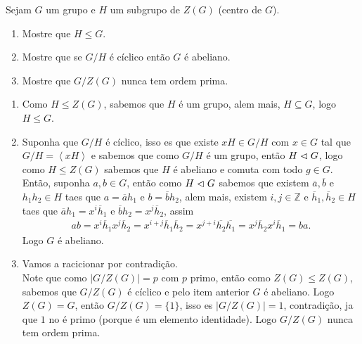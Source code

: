 \begin{homeworkProblem}
  Sejam $G$ um grupo e $H$ um subgrupo de $Z(G)$ (centro de $G$).
  \begin{enumerate}
    \item Mostre que $H \leq G$.
    \item Mostre que se $G/H$ é cíclico então $G$ é abeliano.
    \item Mostre que $G/Z(G)$ nunca tem ordem prima.
  \end{enumerate}
  \begin{solution}
    \begin{enumerate}
      \item Como $H\leq Z(G)$, sabemos que $H$ é um grupo, alem mais, $H\subseteq G$, logo $H\leq G$.
      \item Suponha que $G/H$ é cíclico, isso es que existe $xH\in G/H$ com $x\in G$ tal que $G/H=\left\langle xH \right\rangle$ e sabemos que como $G/H$ é um grupo, então $H\vartriangleleft G$, logo como $H\leq Z(G)$ sabemos que $H$ é abeliano e comuta com todo $g\in G$.\\
        Então, suponha $a,b\in G$, então como $H\vartriangleleft G$ sabemos que existem $\overline{a},\overline{b}$ e $h_1h_2\in H$ taes que $a=\overline{a}h_1$ e $b=\overline{b}h_2$, alem mais, existem $i,j\in\mathbb{Z}$ e $\overline{h}_1,\overline{h}_2\in H$ taes que $\overline{a}h_1=x^{i}\overline{h}_1$ e $\overline{b}h_2=x^{j}\overline{h}_2$, assim
        \begin{align*}
          ab=x^{i}\overline{h}_1x^{j}\overline{h}_2=x^{i+j}\overline{h}_1\overline{h}_2=x^{j+i}\overline{h_2}\overline{h_1}=x^{j}\overline{h}_2x^{i}\overline{h}_1=ba.
        \end{align*}
        Logo $G$ é abeliano.
      \item Vamos a racicionar por contradição.\\
        Note que como $|G/Z(G)|=p$ com $p$ primo, então como $Z(G)\leq Z(G)$, sabemos que $G/Z(G)$ é cíclico e pelo item anterior $G$ é abeliano. Logo $Z(G)=G$, então $G/Z(G)=\{1\}$, isso es $|G/Z(G)|=1$, contradição, ja que $1$ no é primo (porque é um elemento identidade). Logo $G/Z(G)$ nunca tem ordem prima.  
    \end{enumerate}
  \end{solution}
\end{homeworkProblem}
